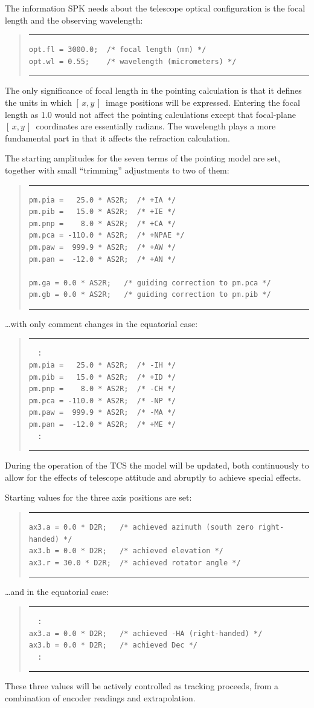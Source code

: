 \documentclass[11pt,fleqn,twoside,\paper]{article}
\renewcommand{\_}{{\tt\char'137}}     %
\newcommand{\xy}        {$[\,x,y\,]$}
\newcommand{\scode}     {\goodbreak
                         \begin{quote}
                         \vspace{-6ex}
                         \rule[-2ex]{36em}{0.03ex}}
\newcommand{\ecode}     {\rule[2ex]{36em}{0.03ex}
                         \end{quote}
                         \vspace{-4ex}
                         \goodbreak}
\begin{document}
The information SPK needs about the telescope optical
configuration is the focal length and the observing wavelength:
\scode\begin{verbatim}
opt.fl = 3000.0;  /* focal length (mm) */
opt.wl = 0.55;    /* wavelength (micrometers) */
\end{verbatim}\ecode
The only significance of focal length in the pointing
calculation is that it defines the units in which \xy\
image positions will be expressed.  Entering the focal
length as 1.0 would not affect the pointing calculations
except that focal-plane \xy\ coordinates are essentially
radians.  The wavelength plays a more fundamental part in
that it affects the refraction calculation.

The starting amplitudes for the seven terms of the pointing
model are set, together with small ``trimming'' adjustments
to two of them:
\scode\begin{verbatim}
pm.pia =   25.0 * AS2R;  /* +IA */
pm.pib =   15.0 * AS2R;  /* +IE */
pm.pnp =    8.0 * AS2R;  /* +CA */
pm.pca = -110.0 * AS2R;  /* +NPAE */
pm.paw =  999.9 * AS2R;  /* +AW */
pm.pan =  -12.0 * AS2R;  /* +AN */

pm.ga = 0.0 * AS2R;   /* guiding correction to pm.pca */
pm.gb = 0.0 * AS2R;   /* guiding correction to pm.pib */
\end{verbatim}\ecode
\ldots with only comment changes in the equatorial case:
\scode\begin{verbatim}
  :
pm.pia =   25.0 * AS2R;  /* -IH */
pm.pib =   15.0 * AS2R;  /* +ID */
pm.pnp =    8.0 * AS2R;  /* -CH */
pm.pca = -110.0 * AS2R;  /* -NP */
pm.paw =  999.9 * AS2R;  /* -MA */
pm.pan =  -12.0 * AS2R;  /* +ME */
  :
\end{verbatim}\ecode
During the operation of the TCS the model will be updated, both
continuously to allow for the effects of telescope attitude and
abruptly to achieve special effects.

Starting values for the three axis positions are set:
\scode\begin{verbatim}
ax3.a = 0.0 * D2R;   /* achieved azimuth (south zero right-handed) */
ax3.b = 0.0 * D2R;   /* achieved elevation */
ax3.r = 30.0 * D2R;  /* achieved rotator angle */
\end{verbatim}\ecode
\ldots and in the equatorial case:
\scode\begin{verbatim}
  :
ax3.a = 0.0 * D2R;   /* achieved -HA (right-handed) */
ax3.b = 0.0 * D2R;   /* achieved Dec */
  :
\end{verbatim}\ecode
These three values will be actively controlled as tracking
proceeds, from a combination of encoder readings and extrapolation.
\end{document}
